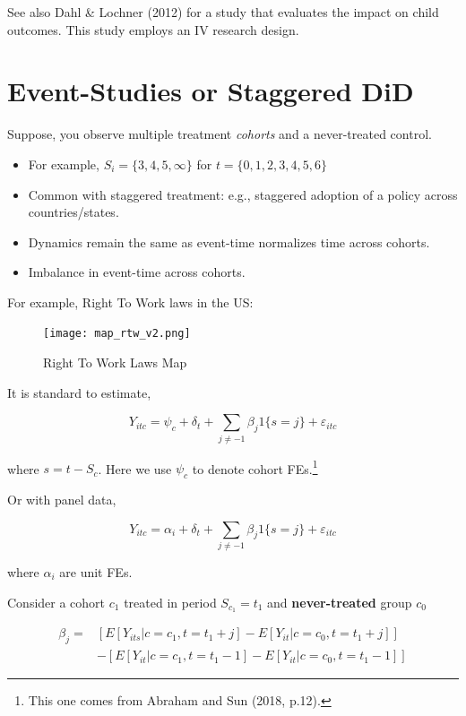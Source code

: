 \documentclass[
  letterpaper,
  DIV=11,
  numbers=noendperiod]{scrreprt}
\providecommand{\tightlist}{%
  \setlength{\itemsep}{0pt}\setlength{\parskip}{0pt}}\usepackage{longtable,booktabs,array}
\theoremstyle{definition}
\theoremstyle{remark}
\begin{document}
See also Dahl \& Lochner (2012) for a study that evaluates the impact on
child outcomes. This study employs an IV research design.

\hfill\break
\hfill\break

\chapter{Event-Studies or Staggered
DiD}\label{event-studies-or-staggered-did}

Suppose, you observe multiple treatment \emph{cohorts} and a
never-treated control.

\begin{itemize}
\tightlist
\item
  For example, \(S_i = \{3,4,5,\infty\}\) for \(t=\{0,1,2,3,4,5,6\}\)
\item
  Common with staggered treatment: e.g., staggered adoption of a policy
  across countries/states.
\item
  Dynamics remain the same as event-time normalizes time across cohorts.
\item
  Imbalance in event-time across cohorts.
\end{itemize}

For example, Right To Work laws in the US:

\begin{figure}[H]

{\centering \texttt{[image: map\_rtw\_v2.png]}

}

\caption{Right To Work Laws Map}

\end{figure}%

It is standard to estimate,

\[
Y_{itc} = \psi_c + \delta_t + \sum_{j\neq-1}\beta_j 1\{s=j\} + \varepsilon_{itc}
\]

where \(s=t-S_c\). Here we use \(\psi_c\) to denote cohort
FEs.\footnote{This one comes from Abraham and Sun (2018, p.12).}

Or with panel data,

\[
Y_{itc} = \alpha_i + \delta_t + \sum_{j\neq-1}\beta_j 1\{s=j\} + \varepsilon_{itc}
\]

where \(\alpha_i\) are unit FEs.

Consider a cohort \(c_1\) treated in period \(S_{c_1} = t_1\) and
\textbf{never-treated} group \(c_0\)

\[
\begin{align*}
\beta_j=&\left[E[Y_{its}|c=c_1,t = t_1 + j] - E[Y_{it}|c=c_0,t = t_1+j]\right] \\
&-\left[E[Y_{it}|c=c_1,t = t_1 - 1] - E[Y_{it}|c=c_0,t = t_1 -1]\right]
\end{align*}
\]
\end{document}
